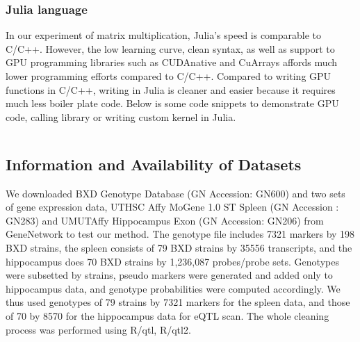 \documentclass[9pt,twocolumn,twoside,lineno]{gsag3jnl}
\begin{document}
\subsubsection{Julia language}
In our experiment of matrix multiplication, Julia's speed is comparable to C/C++. 
However, the low learning curve, clean syntax, as well as support to GPU programming libraries such as CUDAnative \citep{CUDAnative.jl-2018} and CuArrays affords much lower programming efforts compared to C/C++.
Compared to writing GPU functions in C/C++, writing in Julia is cleaner and easier because it requires much less boiler plate code.
Below is some code snippets to demonstrate GPU code, calling library or writing custom kernel in Julia. 

\inputminted{julia}{code/gpu.jl}

\subsection{Information and Availability of Datasets}

We downloaded BXD Genotype Database (GN Accession: GN600) and two sets of gene expression data, 
UTHSC Affy MoGene 1.0 ST Spleen (GN Accession : GN283)
and  UMUTAffy Hippocampus Exon (GN Accession: GN206) from GeneNetwork to test our method.  
The genotype file includes 7321 markers by 198 BXD strains, the spleen consists of 79 BXD strains by 35556 transcripts, 
and the hippocampus does 70 BXD strains by 1,236,087 probes/probe sets.  
Genotypes were subsetted by strains, pseudo markers were generated and added only to hippocampus data, 
and genotype probabilities were computed accordingly.  We thus used genotypes of 79 strains by 7321 markers for the spleen data, and 
those of 70 by 8570 for the hippocampus data for eQTL scan.  The whole cleaning process was performed using R/qtl, R/qtl2.
\end{document}
